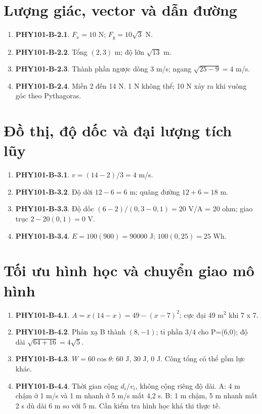 \documentclass[11pt,a4paper,openany]{book}
\begin{document}
\section{Lượng giác, vector và dẫn đường}
\begin{enumerate}
\item \textbf{PHY101-B-2.1}. $F_x=10$ N; $F_y=10\sqrt3$ N.
\item \textbf{PHY101-B-2.2}. Tổng $(2,3)$ m; độ lớn $\sqrt{13}$ m.
\item \textbf{PHY101-B-2.3}. Thành phần ngược dòng 3 m/s; ngang $\sqrt{25-9}=4$ m/s.
\item \textbf{PHY101-B-2.4}. Miền 2 đến 14 N. 1 N không thể; 10 N xảy ra khi vuông góc theo Pythagoras.
\end{enumerate}
\section{Đồ thị, độ dốc và đại lượng tích lũy}
\begin{enumerate}
\item \textbf{PHY101-B-3.1}. $v=(14-2)/3=4$ m/s.
\item \textbf{PHY101-B-3.2}. Độ dời $12-6=6$ m; quãng đường $12+6=18$ m.
\item \textbf{PHY101-B-3.3}. Độ dốc $(6-2)/(0{,}3-0{,}1)=20$ V/A = 20 ohm; giao trục $2-20(0{,}1)=0$ V.
\item \textbf{PHY101-B-3.4}. $E=100(900)=90000$ J; $100(0{,}25)=25$ Wh.
\end{enumerate}
\section{Tối ưu hình học và chuyển giao mô hình}
\begin{enumerate}
\item \textbf{PHY101-B-4.1}. $A=x(14-x)=49-(x-7)^2$; cực đại 49 m$^2$ khi 7 x 7.
\item \textbf{PHY101-B-4.2}. Phản xạ B thành $(8,-1)$; tỉ phần $3/4$ cho P=(6,0); độ dài $\sqrt{64+16}=4\sqrt5$.
\item \textbf{PHY101-B-4.3}. $W=60\cos\theta$: 60 J, 30 J, 0 J. Công tổng có thể gồm lực khác.
\item \textbf{PHY101-B-4.4}. Thời gian cộng $d_i/v_i$, không cộng riêng độ dài. A: 4 m chậm ở 1 m/s và 1 m nhanh ở 5 m/s mất 4,2 s. B: 1 m chậm, 5 m nhanh mất 2 s dù dài 6 m so với 5 m. Cần kiểm tra hình học khả thi thực tế.
\end{enumerate}
\end{document}
